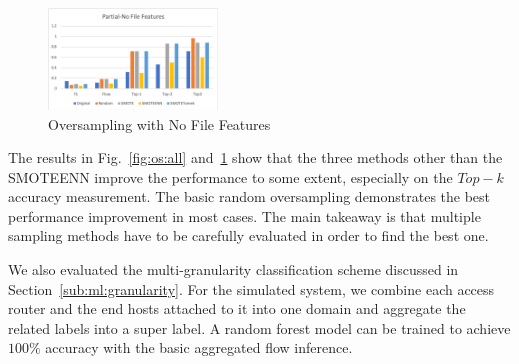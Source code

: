 \begin{figure}[!ht]
\begin{center}
\includegraphics[width=0.4\textwidth]{./figure/partial-nofile-oversampling}
\end{center}
\caption{Oversampling with No File Features}
\label{fig:os:nofile}
\end{figure}

The results in Fig.~\ref{fig:os:all} and~\ref{fig:os:nofile} show that the three methods other than the SMOTEENN improve the performance to some extent, especially on the $Top-k$ accuracy measurement. The basic random oversampling demonstrates the best performance improvement in most cases.  The main takeaway is that multiple sampling methods have to be carefully evaluated in order to find the best one.

We also evaluated the multi-granularity classification scheme discussed in Section~\ref{sub:ml:granularity}. For the simulated system, we combine each access router and the end hosts attached to it into one domain and aggregate the related labels into a super label. A random forest model can be trained to achieve $100\%$ accuracy with the basic aggregated flow inference.    
